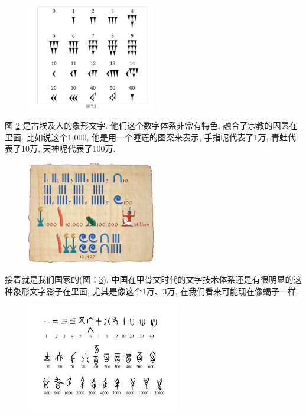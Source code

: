 \begin{figure}[ht]
  \centering\includegraphics[width=0.5\textwidth]{asset/df03e920-b04e-493d-aab6-b5ffb16eb0bf.png}
  \caption{}
  \label{fig:img2_5}
\end{figure}

图 \ref{fig:img2_6} 是古埃及人的象形文字. 他们这个数字体系非常有特色, 融合了宗教的因素在里面. 比如说这个1,000, 他是用一个睡莲的图案来表示, 手指呢代表了1万, 青蛙代表了10万, 天神呢代表了100万. 

\begin{figure}[ht]
  \centering\includegraphics[width=0.5\textwidth]{asset/191cd6bc-63e3-4090-af11-bf3e7de6f4db.png}
  \caption{}
  \label{fig:img2_6}
\end{figure}

接着就是我们国家的(图：\ref{fig:img2_7}). 中国在甲骨文时代的文字技术体系还是有很明显的这种象形文字影子在里面, 尤其是像这个1万、3万, 在我们看来可能现在像蝎子一样. 

\begin{figure}[ht]
  \centering\includegraphics[width=0.6\textwidth]{asset/56174953-293d-47aa-893c-52ab80acacd9.png}
  \caption{}
  \label{fig:img2_7}
\end{figure}

